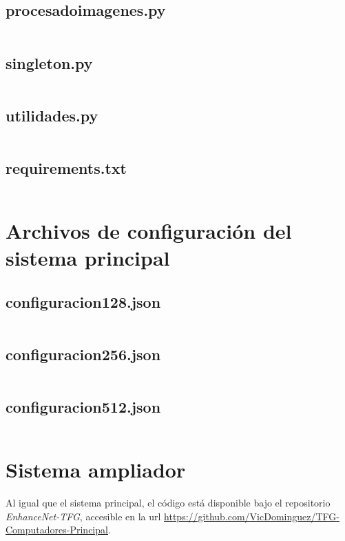 \documentclass[./main.tex]{subfiles}
\begin{document}
\subsection{procesado\textunderscore imagenes.py}
\inputminted[fontsize=\footnotesize]{python}{./codigo/principal/procesado_imagenes.py}

\subsection{singleton.py}
\inputminted[fontsize=\footnotesize]{python}{./codigo/principal/singleton.py}

\subsection{utilidades.py}
\inputminted[fontsize=\footnotesize]{python}{./codigo/principal/utilidades.py}

\subsection{requirements.txt}
\inputminted[fontsize=\footnotesize]{python}{./codigo/principal/requirements.txt}

\newpage

\section{Archivos de configuración del sistema principal}
\label{anexo:archivos_configuracion}
\subsection{configuracion\textunderscore 128.json}
\inputminted[fontsize=\footnotesize]{json}{./codigo/configuracion/configuracion_128.json}
\subsection{configuracion\textunderscore 256.json}
\inputminted[fontsize=\footnotesize]{json}{./codigo/configuracion/configuracion_256.json}
\subsection{configuracion\textunderscore 512.json}
\inputminted[fontsize=\footnotesize]{json}{./codigo/configuracion/configuracion_512.json}
\newpage

\section{Sistema ampliador}
\label{anexo:sistema_ampliador}
Al igual que el sistema principal, el código está disponible bajo el repositorio \textit{EnhanceNet-TFG}, 
accesible en la url \url{https://github.com/VicDominguez/TFG-Computadores-Principal}. \newline
\end{document}
